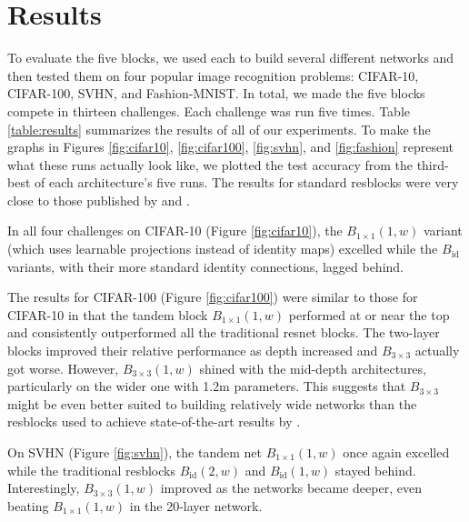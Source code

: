 \documentclass{article} %
\begin{document}



\section{Results}

To evaluate the five blocks, we used each to build several different networks and then tested them on four popular image recognition problems: CIFAR-10, CIFAR-100, SVHN, and Fashion-MNIST. In total, we made the five blocks compete in thirteen challenges. Each challenge was run five times. Table \ref{table:results} summarizes the results of all of our experiments. To make the graphs in Figures \ref{fig:cifar10}, \ref{fig:cifar100}, \ref{fig:svhn}, and \ref{fig:fashion} represent what these runs actually look like, we plotted the test accuracy from the third-best of each architecture's five runs.  %
The results for standard resblocks were very close to those published by \cite{ResNets} and \cite{Wideresnets}.


In all four challenges on CIFAR-10 (Figure \ref{fig:cifar10}), the $B_{1\times 1}(1,w)$ variant (which uses learnable projections instead of identity maps) excelled while the $B_{\operatorname{id}}$ variants, with their more standard identity connections, lagged behind.

The results for CIFAR-100 (Figure \ref{fig:cifar100}) were similar to those for CIFAR-10 in that the tandem block $B_{1\times 1}(1,w)$ performed at or near the top and consistently outperformed all the traditional resnet blocks.  The two-layer blocks improved their relative performance as depth increased and $B_{3\times 3}$ actually got worse. However, $B_{3\times 3}(1,w)$ shined with the mid-depth  architectures, particularly on the wider one with 1.2m parameters. This suggests that $B_{3\times 3}$ might be even better suited to building relatively wide networks than the resblocks used to achieve state-of-the-art results by \cite{Wideresnets}.

On SVHN (Figure \ref{fig:svhn}), the tandem net $B_{1\times 1}(1,w)$ once again excelled while the traditional resblocks $B_{\operatorname{id}}(2,w)$ and $B_{\operatorname{id}}(1,w)$ stayed behind. Interestingly, $B_{3\times 3}(1,w)$ improved as the networks became deeper, even beating $B_{1\times 1}(1,w)$ in the 20-layer network. 
\end{document}
